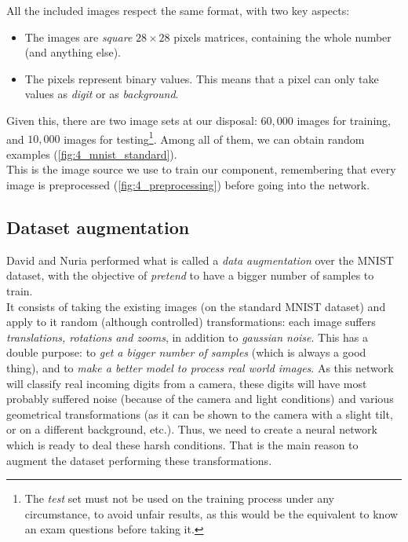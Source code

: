 			All the included images respect the same format, with two key aspects:
			\begin{itemize}
				\item The images are \emph{square} $28 \times 28$ pixels matrices, containing the whole number (and anything else).
				
				\item The pixels represent binary values. This means that a pixel can only take values as \emph{digit} or as \emph{background}.
			\end{itemize}
			
			Given this, there are two image sets at our disposal: $60,000$ images for training, and $10,000$ images for testing\footnote{The \emph{test} set must not be used on the training process under any circumstance, to avoid unfair results, as this would be the equivalent to know an exam questions before taking it.}. Among all of them, we can obtain random examples (\autoref{fig:4_mnist_standard}).\\
			
			This is the image source we use to train our component, remembering that every image is preprocessed (\autoref{fig:4_preprocessing}) before going into the network.\\
			

		\subsection{Dataset augmentation}
			David \cite{dpascualhe} and Nuria \cite{noyaga} performed what is called a \emph{data augmentation} over the MNIST dataset, with the objective of \emph{pretend} to have a bigger number of samples to train.\\
			
			It consists of taking the existing images (on the standard MNIST dataset) and apply to it random (although controlled) transformations: each image suffers \emph{translations, rotations and zooms}, in addition to \emph{gaussian noise}. This has a double purpose: to \emph{get a bigger number of samples} (which is always a good thing), and to \emph{make a better model to process real world images}. As this network will classify real incoming digits from a camera, these digits will have most probably suffered noise (because of the camera and light conditions) and various geometrical transformations (as it can be shown to the camera with a slight tilt, or on a different background, etc.). Thus, we need to create a neural network which is ready to deal these harsh conditions. That is the main reason to augment the dataset performing these transformations.\\
			

